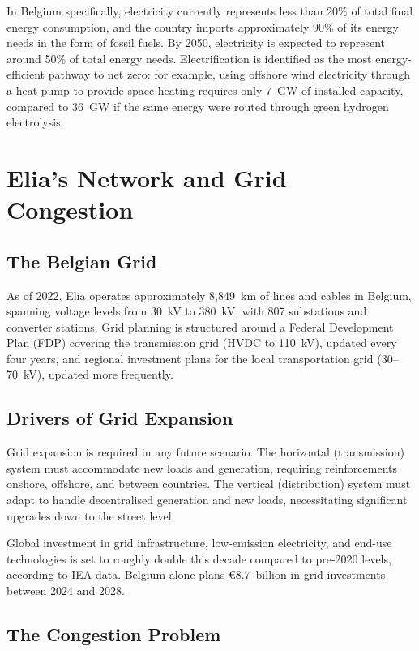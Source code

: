 In Belgium specifically, electricity currently represents less than 20\% of total final energy consumption, and the country imports approximately 90\% of its energy needs in the form of fossil fuels. By 2050, electricity is expected to represent around 50\% of total energy needs. Electrification is identified as the most energy-efficient pathway to net zero: for example, using offshore wind electricity through a heat pump to provide space heating requires only 7~GW of installed capacity, compared to 36~GW if the same energy were routed through green hydrogen electrolysis.

\section{Elia's Network and Grid Congestion}

\subsection{The Belgian Grid}

As of 2022, Elia operates approximately 8,849~km of lines and cables in Belgium, spanning voltage levels from 30~kV to 380~kV, with 807 substations and converter stations. Grid planning is structured around a Federal Development Plan (FDP) covering the transmission grid (HVDC to 110~kV), updated every four years, and regional investment plans for the local transportation grid (30--70~kV), updated more frequently.

\subsection{Drivers of Grid Expansion}

Grid expansion is required in any future scenario. The horizontal (transmission) system must accommodate new loads and generation, requiring reinforcements onshore, offshore, and between countries. The vertical (distribution) system must adapt to handle decentralised generation and new loads, necessitating significant upgrades down to the street level.

Global investment in grid infrastructure, low-emission electricity, and end-use technologies is set to roughly double this decade compared to pre-2020 levels, according to IEA data. Belgium alone plans \euro8.7~billion in grid investments between 2024 and 2028.

\subsection{The Congestion Problem}


